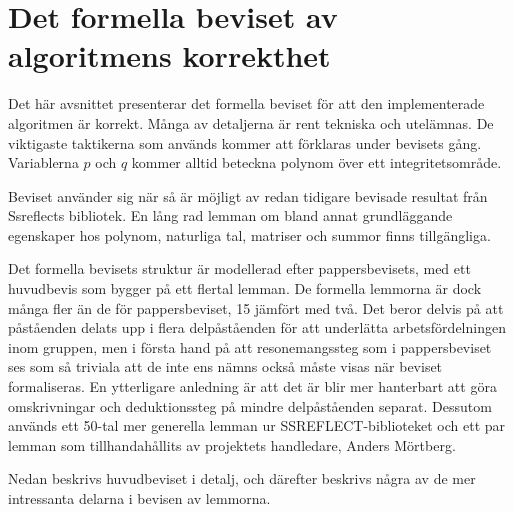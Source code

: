 \section{Det formella beviset av algoritmens korrekthet}
Det här avsnittet presenterar det formella beviset för att den implementerade
algoritmen är korrekt. Många av detaljerna är rent tekniska och utelämnas. De
viktigaste taktikerna som används kommer att förklaras under bevisets gång.
Variablerna $p$ och $q$ kommer alltid beteckna polynom över ett
integritetsområde.

Beviset använder sig när så är möjligt av redan tidigare bevisade resultat från
Ssreflects bibliotek. En lång rad lemman om bland annat grundläggande
egenskaper hos polynom, naturliga tal, matriser och summor finns tillgängliga.

Det formella bevisets struktur är modellerad efter pappersbevisets, med ett
huvudbevis som bygger på ett flertal lemman. De formella lemmorna är dock många
fler än de för pappersbeviset, 15 jämfört med två. Det beror delvis på att
påståenden delats upp i flera delpåståenden för att underlätta
arbetsfördelningen inom gruppen, men i första hand på att resonemangssteg som i
pappersbeviset ses som så triviala att de inte ens nämns också måste visas när
beviset formaliseras. En ytterligare anledning är att det är blir mer
hanterbart att göra omskrivningar och deduktionssteg på mindre delpåståenden
separat. Dessutom används ett 50-tal mer generella lemman ur
SSREFLECT-biblioteket och ett par lemman som tillhandahållits av projektets
handledare, Anders Mörtberg.

Nedan beskrivs huvudbeviset i detalj, och därefter beskrivs några av de mer
intressanta delarna i bevisen av lemmorna.

